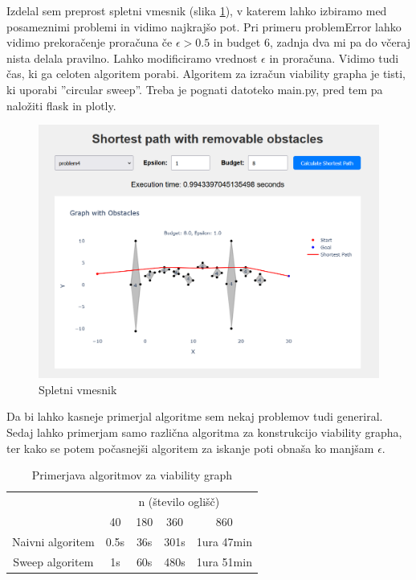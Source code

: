 \documentclass{article}
\begin{document}
Izdelal sem preprost spletni vmesnik (slika \ref{fig:web}), v katerem lahko izbiramo med posameznimi problemi in vidimo najkrajšo pot. Pri primeru problemError lahko vidimo prekoračenje proračuna če $\epsilon > 0.5$ in budget $6$, zadnja dva mi pa do včeraj nista delala pravilno. Lahko modificiramo vrednost $\epsilon$ in proračuna. Vidimo tudi čas, ki ga celoten algoritem porabi. Algoritem za izračun viability grapha je tisti, ki uporabi ''circular sweep''. Treba je pognati datoteko main.py, pred tem pa naložiti flask in plotly.

\begin{figure}[ht]
    \centering
    \includegraphics[width=1\textwidth]{web.png}
    \caption{Spletni vmesnik}
    \label{fig:web}
\end{figure}

Da bi lahko kasneje primerjal algoritme sem nekaj problemov tudi generiral. Sedaj lahko primerjam samo različna algoritma za konstrukcijo viability grapha, ter kako se potem počasnejši algoritem za iskanje poti obnaša ko manjšam $\epsilon$.

\begin{table}[h]
    \centering
    \begin{tabular}{|c|c|c|c|c|}
        \hline
        & \multicolumn{4}{c|}{n (število oglišč)} \\
        \cline{2-5}
        & 40 & 180 & 360 & 860 \\
        \hline
        Naivni algoritem & 0.5s & 36s &  301s &  1ura 47min\\
        \hline
        Sweep algoritem & 1s & 60s & 480s  & 1ura 51min \\
        \hline
    \end{tabular}
    \caption{Primerjava algoritmov za viability graph}
    \label{tab:1}
\end{table}
\end{document}
